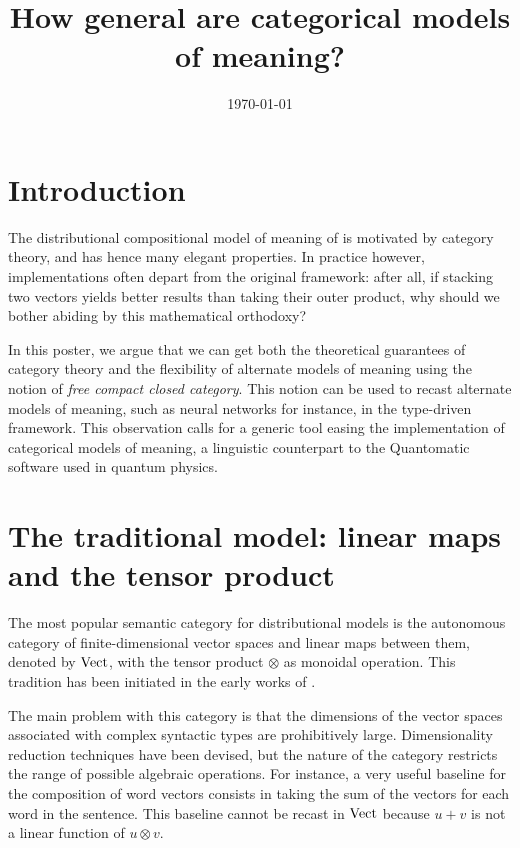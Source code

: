 \documentclass[a4paper,11pt]{article}
\title{How general are categorical models of meaning?}
\date{\today}
\begin{document}
\maketitle

\section{Introduction}

The distributional compositional model of meaning of \cite{clark2008compositional}
is motivated by category theory, and has hence many elegant properties. In practice
however, implementations often depart from the original framework: after all, if
stacking two vectors yields better results than taking their outer product, why should
we bother abiding by this mathematical orthodoxy? 

In this poster, we argue that we can get both the theoretical guarantees
of category theory and the flexibility of alternate models of meaning using
the notion of \emph{free compact closed category}.
This notion can be used to recast alternate models of meaning, such as neural networks
for instance, in the type-driven framework.
This observation calls for a generic tool easing the implementation of categorical
models of meaning, a linguistic counterpart to the Quantomatic software used
in quantum physics.


\section{The traditional model: linear maps and the tensor product}

The most popular semantic category for distributional models is the
autonomous category of finite-dimensional vector spaces and linear maps
between them, denoted by $\operatorname{Vect}$, with the tensor product $\otimes$ as
monoidal operation.  This
tradition has been initiated in the early works of
\cite{clark2007combining,clark2008compositional,coecke2010mathematical}.

The main problem with this category is that the dimensions of the vector
spaces associated with complex syntactic types are prohibitively large.
Dimensionality reduction techniques have been devised, but the nature of
the category restricts the range of possible algebraic operations. For
instance, a very useful baseline for the composition of word vectors
consists in taking the sum of the vectors for each word in the sentence.
This baseline cannot be recast in $\operatorname{Vect}$
because $u + v$ is not a linear function of $u \otimes v$.
\end{document}
